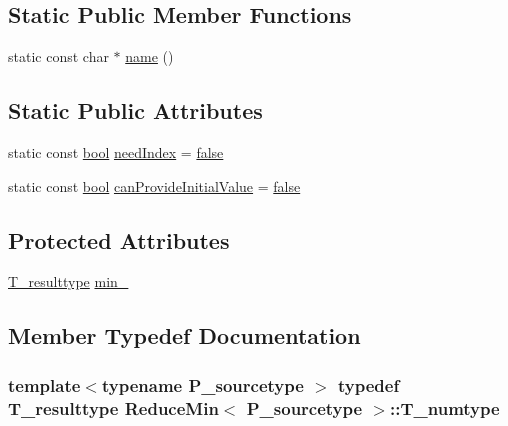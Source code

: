 \subsection*{Static Public Member Functions}
\begin{DoxyCompactItemize}
\item 
static const char $\ast$ \hyperlink{classReduceMin_a53442a6fefbf6211a45d9c445e89e77c}{name} ()
\end{DoxyCompactItemize}
\subsection*{Static Public Attributes}
\begin{DoxyCompactItemize}
\item 
static const \hyperlink{compiler_8h_abb452686968e48b67397da5f97445f5b}{bool} \hyperlink{classReduceMin_aa96204f893b09a800bf6633ce41a0ee4}{need\+Index} = \hyperlink{compiler_8h_a65e9886d74aaee76545e83dd09011727}{false}
\item 
static const \hyperlink{compiler_8h_abb452686968e48b67397da5f97445f5b}{bool} \hyperlink{classReduceMin_aa8453c26a53a278a46172e56e347e715}{can\+Provide\+Initial\+Value} = \hyperlink{compiler_8h_a65e9886d74aaee76545e83dd09011727}{false}
\end{DoxyCompactItemize}
\subsection*{Protected Attributes}
\begin{DoxyCompactItemize}
\item 
\hyperlink{classReduceMin_a80cd05c565051ac4bcfdbb85b6c4d9fb}{T\+\_\+resulttype} \hyperlink{classReduceMin_ab6ad6e8065cdff6f98c75c5ff2050852}{min\+\_\+}
\end{DoxyCompactItemize}


\subsection{Member Typedef Documentation}
\hypertarget{classReduceMin_a28eb01a636caef7d9430a57a4f6943a4}{}
\subsubsection[{T\+\_\+numtype}]{\setlength{\rightskip}{0pt plus 5cm}template$<$typename P\+\_\+sourcetype $>$ typedef {\bf T\+\_\+resulttype} {\bf Reduce\+Min}$<$ P\+\_\+sourcetype $>$\+::{\bf T\+\_\+numtype}}\label{classReduceMin_a28eb01a636caef7d9430a57a4f6943a4}
\hypertarget{classReduceMin_a80cd05c565051ac4bcfdbb85b6c4d9fb}{}
